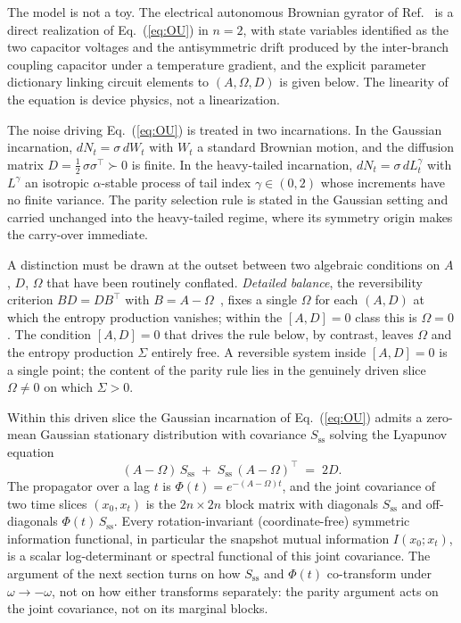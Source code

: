 \documentclass[%
 reprint,
 superscriptaddress,
 nofootinbib,
 nobibnotes,
 amsmath,amssymb,
 aps,
 prl,
 floatfix,
]{revtex4-2}
\newcommand{\Sss}{S_{\mathrm{ss}}}
\begin{document}
The model is not a toy. The electrical autonomous Brownian gyrator of Ref.~\cite{Chiang2017} is a direct realization of Eq.~(\ref{eq:OU}) in $n=2$, with state variables identified as the two capacitor voltages and the antisymmetric drift produced by the inter-branch coupling capacitor under a temperature gradient, and the explicit parameter dictionary linking circuit elements to $(A, \Omega, D)$ is given below. The linearity of the equation is device physics, not a linearization.

The noise driving Eq.~(\ref{eq:OU}) is treated in two incarnations. In the Gaussian incarnation, $dN_t = \sigma\,dW_t$ with $W_t$ a standard Brownian motion, and the diffusion matrix $D = \tfrac12\,\sigma\sigma^\top \succ 0$ is finite. In the heavy-tailed incarnation, $dN_t = \sigma\,dL^\gamma_t$ with $L^\gamma$ an isotropic $\alpha$-stable process of tail index $\gamma \in (0,2)$ whose increments have no finite variance. The parity selection rule is stated in the Gaussian setting and carried unchanged into the heavy-tailed regime, where its symmetry origin makes the carry-over immediate.

A distinction must be drawn at the outset between two algebraic conditions on $A$, $D$, $\Omega$ that have been routinely conflated. \emph{Detailed balance}, the reversibility criterion $B D = D B^\top$ with $B = A - \Omega$~\cite{Risken1989,Godreche2019}, fixes a single $\Omega$ for each $(A, D)$ at which the entropy production vanishes; within the $[A,D]=0$ class this is $\Omega = 0$. The condition $[A,D] = 0$ that drives the rule below, by contrast, leaves $\Omega$ and the entropy production $\Sigma$ entirely free. A reversible system inside $[A,D]=0$ is a single point; the content of the parity rule lies in the genuinely driven slice $\Omega \neq 0$ on which $\Sigma > 0$.

Within this driven slice the Gaussian incarnation of Eq.~(\ref{eq:OU}) admits a zero-mean Gaussian stationary distribution with covariance $\Sss$ solving the Lyapunov equation
\begin{equation}\label{eq:lyap}
(A-\Omega)\,\Sss \;+\; \Sss\,(A-\Omega)^\top \;=\; 2D.
\end{equation}
The propagator over a lag $t$ is $\Phi(t) = e^{-(A-\Omega)t}$, and the joint covariance of two time slices $(x_0, x_t)$ is the $2n \times 2n$ block matrix with diagonals $\Sss$ and off-diagonals $\Phi(t)\,\Sss$. Every rotation-invariant (coordinate-free) symmetric information functional, in particular the snapshot mutual information $I(x_0;x_t)$, is a scalar log-determinant or spectral functional of this joint covariance. The argument of the next section turns on how $\Sss$ and $\Phi(t)$ co-transform under $\omega \to -\omega$, not on how either transforms separately: the parity argument acts on the joint covariance, not on its marginal blocks.
\end{document}
